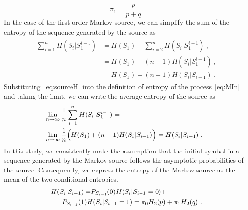\documentclass[journal]{IEEEtranTCOM}
\begin{document}
\begin{equation}
    \pi_{1} = \frac{p}{p+q}.\label{eq:pi1stationany}
\end{equation}
In the case of the first-order Markov source, we can simplify the sum of the entropy of the sequence generated by the source as
\begin{align}
\begin{split}
    \sum_{i=1}^{n} H(S_{i}|S_{1}^{i-1}) &= H(S_{1}) + \sum_{i=2}^{n} H(S_{i}|S_{1}^{i-1})~,\\&
    =H(S_{1}) +(n-1) H(S_{i}|S_{1}^{i-1})~,\\&
    =H(S_{1}) +(n-1) H(S_{i}|S_{i-1})~.
    \label{eq:sourceH}
\end{split}
\end{align}
Substituting~\eqref{eq:sourceH} into the definition of entropy of the process~\eqref{eq:MIn} and taking the limit, we can write the average entropy of the source as
\begin{align}
\begin{split}
    &\hspace{-0.28cm}\lim_{n\to\infty}\frac{1}{n}\sum_{i=1}^{n} H(S_{i}|S_{1}^{i-1}) =\\&\hspace{-0.28cm}\lim_{n\to\infty}\frac{1}{n} \Big(H(S_{1})+(n-1) H(S_{i}|S_{i-1})\Big)
    = H(S_{i}|S_{i-1})~.\label{eq:HCoSrc}
\end{split}
\end{align}
In this study, we consistently make the assumption that the initial symbol in a sequence generated by the Markov source follows the asymptotic probabilities of the source. Consequently, we express the entropy of the Markov source as the mean of the two conditional entropies.
\begin{align}
\begin{split}
    H(S_{i}|S_{i-1}) =& P_{S_{i-1}}(0)H(S_{i}|S_{i-1}=0)+\\&\hspace{-1.5cm} P_{S_{i-1}}(1)H(S_{i}|S_{i-1}=1)
    =\pi_{0}H_{2}(p)+\pi_{1}H_{2}(q)~.
\end{split}
\end{align}
\end{document}
